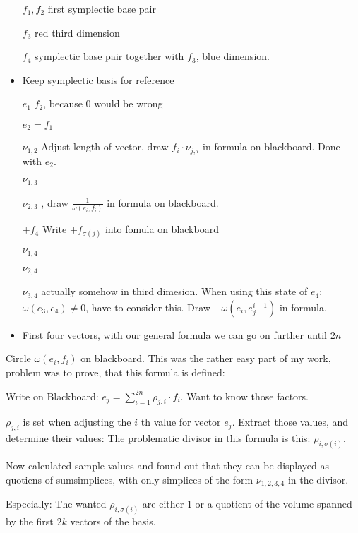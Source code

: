 \documentclass[12pt,a4paper]{scrartcl}
\begin{document}
\begin{itemize}
  \item[\( f_1, f_2 \)] first symplectic base pair
  \item[\( f_3 \)] red third dimension
  \item[\( f_4 \)] symplectic base pair together with \( f_3 \), blue dimension.
  \item Keep symplectic basis for reference
  \item[\(e_1\)] \( f_2 \), because \( 0 \) would be wrong
  \item[\(e_2 = f_1\)] 
  \item[\(\nu_{1,2}\)] Adjust length of vector, draw \( f_i \cdot \nu_{j,i} \) in formula on blackboard. Done with \( e_2 \).
  \item[\(\nu_{1,3}\)] 
  \item[\(\nu_{2,3}\)] , draw \( \frac{1}{\omega\left( e_i, f_i \right)} \) in formula on blackboard.
  \item[\(+f_4\)] Write \( + f_{\sigma\left(j\right)}\) into fomula on blackboard
  \item[\(\nu_{1,4}\)] 
  \item[\(\nu_{2,4}\)] 
  \item[\(\nu_{3,4}\)] actually somehow in third dimesion. When using this state of \( e_4 \): \( \omega \left( e_3, e_4 \right) \neq 0 \), have to consider this. Draw \( - \omega \left( e_i, e_j^{i-1} \right) \) in formula.
  \item First four vectors, with our general formula we can go on further until \( 2n \)
\end{itemize}


Circle \( \omega\left( e_i, f_i \right) \) on blackboard.
This was the rather easy part of my work, problem was to prove, that this formula is defined:

Write on Blackboard: \( e_j = \sum_{i=1}^{2n} \rho_{j,i} \cdot f_i \). Want to know those factors.

\( \rho_{j,i} \) is set when adjusting the \( i \) th value for vector \( e_j \). Extract those values, and determine their values: The problematic divisor in this formula is this: \( \rho_{i, \sigma \left( i \right)} \).

Now calculated sample values and found out that they can be displayed as quotiens of sumsimplices, with only simplices of the form \( \nu_{1,2,3,4} \) in the divisor.

Especially: The wanted \( \rho_{i, \sigma \left( i \right)} \) are either 1 or a quotient of the volume spanned by the first \( 2k \) vectors of the basis.
\end{document}
